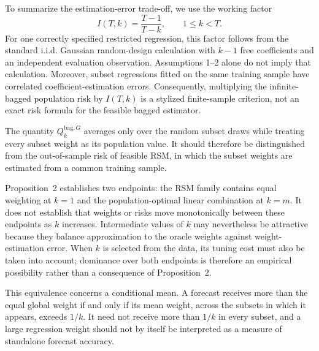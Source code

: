 To summarize the estimation-error trade-off, we use the working factor
\[
 I(T,k)=\frac{T-1}{T-k},\qquad 1\le k<T.
\]
For one correctly specified restricted regression, this factor follows from
the standard i.i.d. Gaussian random-design calculation with $k-1$ free
coefficients and an independent evaluation observation. Assumptions 1--2
alone do not imply that calculation. Moreover, subset regressions fitted on
the same training sample have correlated coefficient-estimation errors.
Consequently, multiplying the infinite-bagged population risk by $I(T,k)$ is
a stylized finite-sample criterion, not an exact risk formula for the feasible
bagged estimator.


The quantity $Q_k^{\mathrm{bag},G}$ averages only over the random subset
draws while treating every subset weight as its population value. It should
therefore be distinguished from the out-of-sample risk of feasible RSM, in
which the subset weights are estimated from a common training sample.


Proposition~2 establishes two endpoints: the RSM family contains equal
weighting at $k=1$ and the population-optimal linear combination at $k=m$.
It does not establish that weights or risks move monotonically between these
endpoints as $k$ increases. Intermediate values of $k$ may nevertheless be
attractive because they balance approximation to the oracle weights against
weight-estimation error. When $k$ is selected from the data, its tuning cost
must also be taken into account; dominance over both endpoints is therefore
an empirical possibility rather than a consequence of Proposition~2.


This equivalence concerns a conditional mean. A forecast receives more than
the equal global weight if and only if its mean weight, across the subsets in
which it appears, exceeds $1/k$. It need not receive more than $1/k$ in every
subset, and a large regression weight should not by itself be interpreted as
a measure of standalone forecast accuracy.

